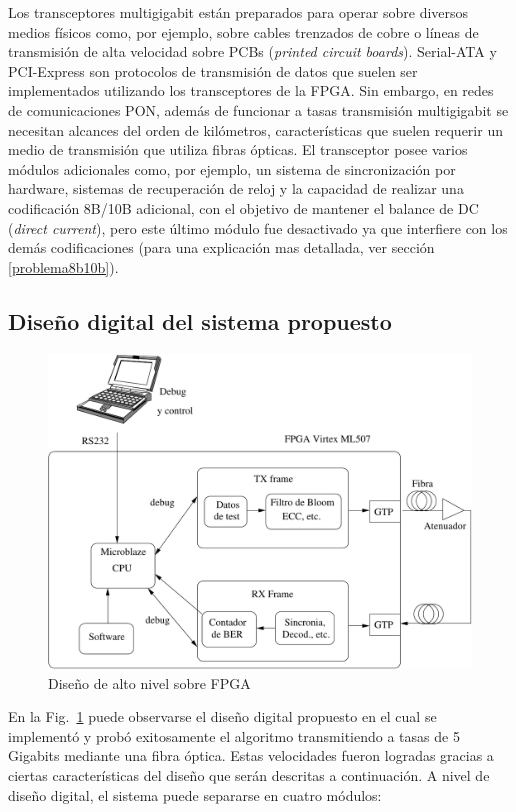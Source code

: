 Los transceptores multigigabit están preparados para operar sobre diversos medios físicos como, por ejemplo, sobre cables trenzados de cobre o líneas de transmisión de alta velocidad sobre PCBs (\textit{printed circuit boards}). Serial-ATA \cite{serial2001high} y PCI-Express \cite{budruk2004pci} son protocolos de transmisión de datos que suelen ser implementados utilizando los transceptores de la FPGA. Sin embargo, en redes de comunicaciones PON, además de funcionar a tasas transmisión  multigigabit se necesitan alcances del orden de kilómetros, características que suelen requerir un medio de transmisión que utiliza fibras ópticas.  El transceptor posee varios módulos adicionales como, por ejemplo, un sistema de sincronización por hardware, sistemas de recuperación de reloj y la capacidad de realizar una codificación 8B/10B \cite{widmer1983dc} adicional, con el objetivo de mantener el balance de DC (\textit{direct current}), pero este último módulo fue desactivado ya que interfiere con los demás codificaciones (para una explicación mas detallada, ver sección \ref{problema8b10b}).

\subsection{Diseño digital del sistema propuesto}
\begin{figure}[t]
  \centering
    \includegraphics[width=6in]{graphs/fpgadesign.pdf}
\caption {Diseño de alto nivel sobre FPGA}
\label{fig:fpgadesign}
\end{figure}

En la Fig.~\ref{fig:fpgadesign} puede observarse el diseño digital propuesto en el cual se implementó y probó exitosamente el algoritmo transmitiendo a tasas de 5 Gigabits mediante una fibra óptica.
Estas velocidades fueron logradas gracias a ciertas características del diseño que serán descritas a continuación. A nivel de diseño digital, el sistema puede separarse en cuatro módulos:

